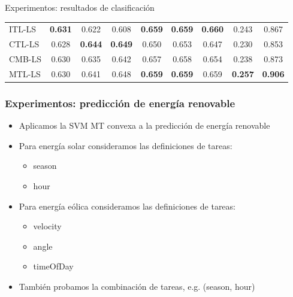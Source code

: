 \documentclass[aspectratio=43,spanish]{beamer}
\newcommand{\fmaxn}[1]{\textbf{#1}}
\newcommand{\fmod}[1]{\textsf{#1}}
\begin{document}
\begin{frame}{Experimentos: resultados de clasificación}
\begin{table}[t]
{\begin{tabular}{ l*{8}{S[table-format=1.3]}}
              \midrule
              \fmod{ITL-LS}    &          \fmaxn{0.631} &           {0.622} &                  {0.608} &         \fmaxn{0.659} &          \fmaxn{0.659} &                 \fmaxn{0.660} &    {0.243} &   {0.867} \\
              \fmod{CTL-LS}    &          {0.628} &           \fmaxn{0.644} &                  \fmaxn{0.649} &         {0.650} &          {0.653} &                 {0.647} &    {0.230} &   {0.853} \\
              \fmod{CMB-LS} &          {0.630} &           {0.635} &                  {0.642} &         {0.657} &          {0.658} &                 {0.654} &    {0.238} &   {0.873} \\
              \fmod{MTL-LS}    &          {0.630} &           {0.641} &                  {0.648} &         \fmaxn{0.659} &          \fmaxn{0.659} &                 {0.659} &    \fmaxn{0.257} &   \fmaxn{0.906} \\
              \bottomrule
            \end{tabular}}
        \end{table}
  
  \end{frame}


\begin{frame}
      \frametitle{Experimentos: predicción de energía renovable}

      \begin{itemize}
            \item Aplicamos la SVM MT convexa a la predicción de energía renovable
            \item Para energía solar consideramos las definiciones de tareas:
            \begin{itemize}
                  \item \fmod{season}
                  \item \fmod{hour}
            \end{itemize}
            \item Para energía eólica consideramos las definiciones de tareas:
            \begin{itemize}
                  \item \fmod{velocity}
                  \item \fmod{angle}
                  \item \fmod{timeOfDay}                  
            \end{itemize}
            \item También probamos la combinación de tareas, e.g. \fmod{(season, hour)}
      \end{itemize}

      

\end{frame}
\end{document}
